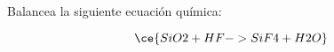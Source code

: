 Balancea la siguiente ecuación química:

\[
    \ce{SiO2 + HF -> SiF4 + H2O}
\]

\begin{solutionbox}{5cm}

\end{solutionbox}